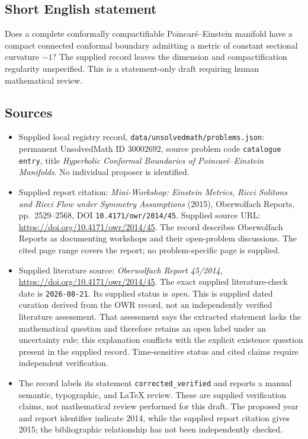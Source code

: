 \documentclass[11pt]{article}
\begin{document}
\subsection{Short English statement}
Does a complete conformally compactifiable Poincar\'e--Einstein manifold have a compact connected conformal boundary admitting a metric of constant sectional curvature \(-1\)? The supplied record leaves the dimension and compactification regularity unspecified. This is a statement-only draft requiring human mathematical review.
\subsection{Sources}
\begin{itemize}
\item Supplied local registry record, \texttt{data/unsolvedmath/problems.json}: permanent UnsolvedMath ID \(30002692\), source problem code \texttt{catalogue entry}, title \emph{Hyperbolic Conformal Boundaries of Poincar\'e--Einstein Manifolds}. No individual proposer is identified.
\item Supplied report citation: \emph{Mini-Workshop: Einstein Metrics, Ricci Solitons and Ricci Flow under Symmetry Assumptions} (2015), Oberwolfach Reports, pp.\ 2529--2568, DOI \texttt{10.4171/owr/2014/45}. Supplied source URL: \url{https://doi.org/10.4171/owr/2014/45}. The record describes Oberwolfach Reports as documenting workshops and their open-problem discussions. The cited page range covers the report; no problem-specific page is supplied.
\item Supplied literature source: \emph{Oberwolfach Report 45/2014}, \url{https://doi.org/10.4171/owr/2014/45}. The exact supplied literature-check date is \texttt{2026-08-21}. Its supplied status is \emph{open}. This is supplied dated curation derived from the OWR record, not an independently verified literature assessment. That assessment says the extracted statement lacks the mathematical question and therefore retains an open label under an uncertainty rule; this explanation conflicts with the explicit existence question present in the supplied record. Time-sensitive status and cited claims require independent verification.
\item The record labels its statement \texttt{corrected\_verified} and reports a manual semantic, typographic, and LaTeX review. These are supplied verification claims, not mathematical review performed for this draft. The proposed year and report identifier indicate 2014, while the supplied report citation gives 2015; the bibliographic relationship has not been independently checked.
\end{itemize}
\end{document}

